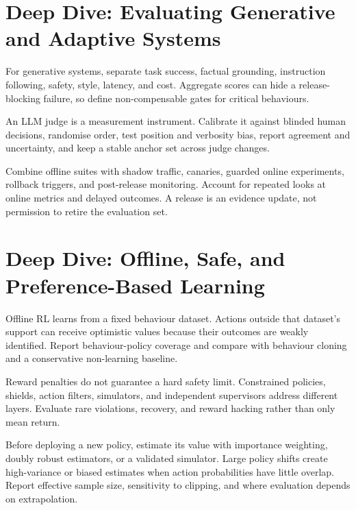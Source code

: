 \expandafter\def\csname almanachdeepdive@evaluation-mlops\endcsname{%
\section{Deep Dive: Evaluating Generative and Adaptive Systems}
\begin{tcbitemize}[skin=sectionraster]
\tcbitem[title={Quality Is a Vector},raster multicolumn=3]
For generative systems, separate task success, factual grounding, instruction
following, safety, style, latency, and cost.
Aggregate scores can hide a release-blocking failure, so define non-compensable
gates for critical behaviours.

\tcbitem[title={Judges Need Evaluation Too},raster multicolumn=3]
An LLM judge is a measurement instrument.
Calibrate it against blinded human decisions, randomise order, test position
and verbosity bias, report agreement and uncertainty, and keep a stable anchor
set across judge changes.

\tcbitem[title={Sequential Release Evidence},raster multicolumn=6]
Combine offline suites with shadow traffic, canaries, guarded online
experiments, rollback triggers, and post-release monitoring.
Account for repeated looks at online metrics and delayed outcomes.
A release is an evidence update, not permission to retire the evaluation set.
\end{tcbitemize}
}

\expandafter\def\csname almanachdeepdive@reinforcement-learning\endcsname{%
\section{Deep Dive: Offline, Safe, and Preference-Based Learning}
\begin{tcbitemize}[skin=sectionraster]
\tcbitem[title={Offline RL and Coverage},raster multicolumn=3]
Offline RL learns from a fixed behaviour dataset.
Actions outside that dataset's support can receive optimistic values because
their outcomes are weakly identified.
Report behaviour-policy coverage and compare with behaviour cloning and a
conservative non-learning baseline.

\tcbitem[title={Safety Is a Constraint},raster multicolumn=3]
Reward penalties do not guarantee a hard safety limit.
Constrained policies, shields, action filters, simulators, and independent
supervisors address different layers.
Evaluate rare violations, recovery, and reward hacking rather than only mean
return.

\tcbitem[title={Off-Policy Evidence},raster multicolumn=6]
Before deploying a new policy, estimate its value with importance weighting,
doubly robust estimators, or a validated simulator.
Large policy shifts create high-variance or biased estimates when action
probabilities have little overlap.
Report effective sample size, sensitivity to clipping, and where evaluation
depends on extrapolation.
\end{tcbitemize}
}

